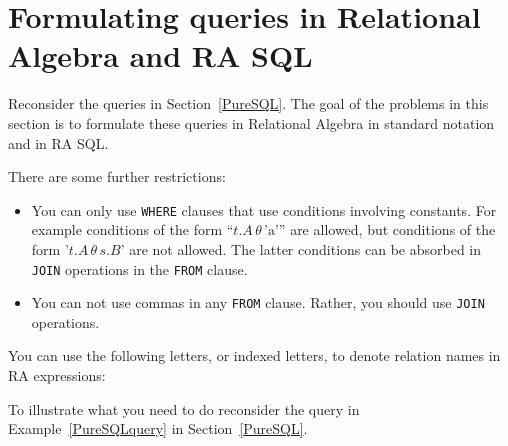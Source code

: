 \documentclass[11pt]{article}
\begin{document}
\newpage

\section{Formulating queries in Relational Algebra and RA SQL}

Reconsider the queries in Section~\ref{PureSQL}.   The goal of the problems in this section
is to formulate these queries in Relational Algebra in standard notation and in RA SQL.  

There are some further restrictions:
\begin{itemize}
\item You can only use {\tt WHERE} clauses that use 
conditions involving constants.   For example conditions of the form ``$t.A\, \theta\, \text{'a'}$'' are allowed, but conditions of the 
form '$t.A\, \theta\, s.B$' are not allowed.   The latter conditions can be absorbed in {\tt JOIN} operations in the {\tt FROM} clause.
\item You can not use commas in any {\tt FROM} clause.  Rather, you should use {\tt JOIN} operations.
\end{itemize}

You can use the following letters, or indexed letters, to denote relation names in RA expressions:

\begin{center}
\end{center}

To illustrate what you need to do reconsider the query in Example~\ref{PureSQLquery} in Section~\ref{PureSQL}.
\end{document}
